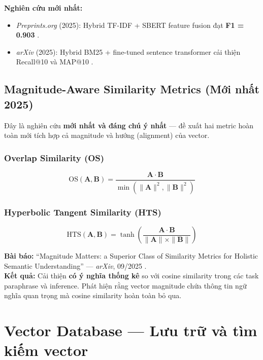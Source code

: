 \documentclass[12pt,a4paper]{article}
\begin{document}
\noindent\textbf{Nghiên cứu mới nhất:}
\begin{itemize}[noitemsep]
    \item \textit{Preprints.org} (2025): Hybrid TF-IDF + SBERT feature fusion đạt \textbf{F1 = 0.903} \cite{hybrid2025}.
    \item \textit{arXiv} (2025): Hybrid BM25 + fine-tuned sentence transformer cải thiện Recall@10 và MAP@10 \cite{hybridbm25sbert2025}.
\end{itemize}

\subsection{Magnitude-Aware Similarity Metrics (Mới nhất 2025)}

Đây là nghiên cứu \textbf{mới nhất và đáng chú ý nhất} --- đề xuất hai metric hoàn toàn mới tích hợp cả magnitude và hướng (alignment) của vector.

\subsubsection{Overlap Similarity (OS)}
\begin{equation}
\text{OS}(\mathbf{A}, \mathbf{B}) = \frac{\mathbf{A} \cdot \mathbf{B}}{\min(\|\mathbf{A}\|^2, \|\mathbf{B}\|^2)}
\label{eq:os}
\end{equation}

\subsubsection{Hyperbolic Tangent Similarity (HTS)}
\begin{equation}
\text{HTS}(\mathbf{A}, \mathbf{B}) = \tanh\left(\frac{\mathbf{A} \cdot \mathbf{B}}{\|\mathbf{A}\| \times \|\mathbf{B}\|}\right)
\label{eq:hts}
\end{equation}

\noindent\textbf{Bài báo:} ``Magnitude Matters: a Superior Class of Similarity Metrics for Holistic Semantic Understanding'' --- \textit{arXiv}, 09/2025 \cite{magnitude2025}.\\
\noindent\textbf{Kết quả:} Cải thiện \textbf{có ý nghĩa thống kê} so với cosine similarity trong các task paraphrase và inference. Phát hiện rằng vector magnitude chứa thông tin ngữ nghĩa quan trọng mà cosine similarity hoàn toàn bỏ qua.

\section{Vector Database --- Lưu trữ và tìm kiếm vector}
\end{document}
